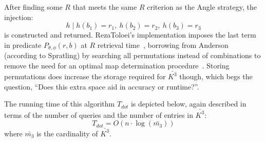 After finding some $R$ that meets the same $R$ criterion as the Angle strategy, the injection:
\begin{equation}
    h \mid h(b_1) = r_1, \ h(b_2) = r_2, \ h(b_3) = r_3
\end{equation}
is constructed and returned.
RezaToloei's implementation imposes the last term in predicate $P_{\theta, \phi}(r, b)$ at $R$ retrieval
time~\cite{toloei:compositeIdentification}, borrowing from Anderson (according to Spratling) by searching all
permutations instead of combinations to remove the need for an optimal map determination
procedure~\cite{anderson:autonomousStarSensing}.
Storing permutations does increase the storage required for $\bar{K^3}$ though, which begs the question,
``Does this extra space aid in accuracy or runtime?''.

%

The running time of this algorithm $T_{dot}$ is depicted below, again described in terms of the number of queries
and the number of entries in $\bar{K^3}$:
\begin{equation}\label{eq:dotComplexity}
    T_{dot} = O\left( n \cdot \log(\bar{m_3}) \right)
\end{equation}
where $\bar{m_3}$ is the cardinality of $\bar{K^3}$.


